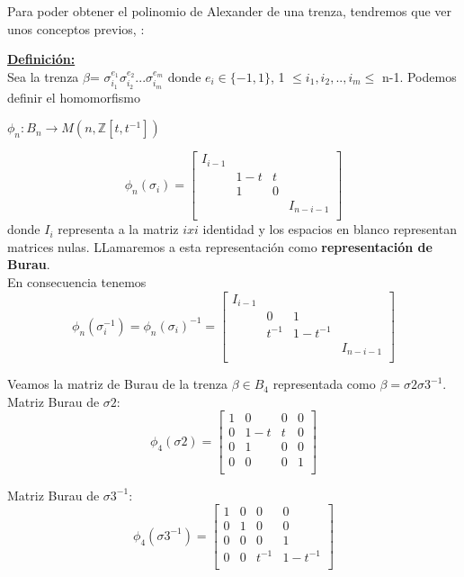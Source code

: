 Para poder obtener el polinomio de Alexander de una trenza, tendremos que ver unos conceptos previos, \cite{3}:

\textbf{\underline{Definición:}}\\
Sea la trenza $\beta $= $\sigma_{i_{1}}^{e_{1}} \sigma_{i_{2}}^{e_{2}} ... \sigma_{i_{m}}^{e_{m}}$ donde $e_{i} \in \{-1,1\}$, 1 $\le i_{1}, i_{2},..,i_{m} \le$ n-1. Podemos definir el homomorfismo
\begin{center}
	 $ \phi_{n} : B_{n}  \rightarrow  M(n,\mathds{Z}[t,t^{-1}])$	 
\end{center}
\[ \phi_{n} ( \sigma_{i}) = \begin{bmatrix}
I_{i-1} &  &  & \\
 & 1-t & t &  \\
 & 1 & 0 &  \\
 &  &  & I_{n-i-1} \\
\end{bmatrix}\]
donde $ I_{i} $ representa a la matriz $ ixi $ identidad y los espacios en blanco representan matrices nulas. LLamaremos a esta representación como \textbf{representación de Burau}.\\

En consecuencia tenemos 
	\[ \phi_{n} ( \sigma_{i}^{-1}) = \phi_{n} ( \sigma_{i})^{-1}= \begin{bmatrix}
	I_{i-1} &  &  & \\
	& 0 & 1 &  \\
	& t^{-1} & 1-t^{-1} &  \\	
	&  &  & I_{n-i-1} \\
	\end{bmatrix}\]


\bigskip
Veamos la matriz de Burau de la trenza $\beta \in B_{4}$ representada como $\beta = \sigma2\sigma3^{-1}$.\\
Matriz Burau de $ \sigma2 $:
	\[ \phi_{4} ( \sigma2) = \begin{bmatrix}
	1 & 0 & 0 & 0 \\
	0 & 1-t & t & 0  \\
	0 & 1 & 0 & 0 \\
	0 & 0 & 0 & 1 \\
	\end{bmatrix}\]

Matriz Burau de $ \sigma3^{-1} $:
\[ \phi_{4} ( \sigma3^{-1}) = \begin{bmatrix}
	1 & 0 & 0 & 0 \\
	0 & 1 & 0 & 0 \\
	0 & 0 & 0 & 1  \\	
	0 & 0 & t^{-1} & 1-t^{-1} \\
\end{bmatrix}\]
 
